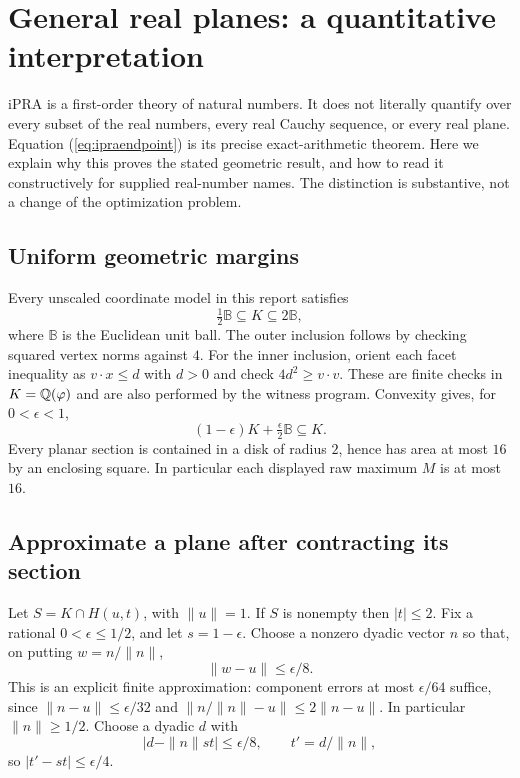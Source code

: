 \section{General real planes: a quantitative interpretation}
\label{sec:realinputs}
iPRA is a first-order theory of natural numbers. It does not literally
quantify over every subset of the real numbers, every real Cauchy
sequence, or every real plane. Equation (\ref{eq:ipraendpoint}) is its
precise exact-arithmetic theorem. Here we explain why this proves the
stated geometric result, and how to read it constructively for supplied
real-number names. The distinction is substantive, not a change of the
optimization problem.

\subsection{Uniform geometric margins}
Every unscaled coordinate model in this report satisfies
\[
 \tfrac12\mathbb B\subseteq K\subseteq2\mathbb B,
                                                               \tag{R1}
\]
where $\mathbb B$ is the Euclidean unit ball. The outer inclusion follows
by checking squared vertex norms against $4$. For the inner inclusion,
orient each facet inequality as $v\cdot x\le d$ with $d>0$ and check
$4d^2\ge v\cdot v$. These are finite checks in $K=\mathbb Q(\varphi)$ and
are also performed by the witness program. Convexity gives, for
$0<\epsilon<1$,
\begin{equation}
 (1-\epsilon)K+\tfrac\epsilon2\mathbb B\subseteq K.
                                                               \label{eq:margin}
\end{equation}
Every planar section is contained in a disk of radius $2$, hence has
area at most $16$ by an enclosing square. In particular each displayed
raw maximum $M$ is at most $16$.

\subsection{Approximate a plane after contracting its section}
Let $S=K\cap H(u,t)$, with $\|u\|=1$. If $S$ is nonempty then
$|t|\le2$. Fix a rational $0<\epsilon\le1/2$, and let $s=1-\epsilon$.
Choose a nonzero dyadic vector $n$ so that, on putting $w=n/\|n\|$,
\[
 \|w-u\|\le\epsilon/8.
\]
This is an explicit finite approximation: component errors at most
$\epsilon/64$ suffice, since $\|n-u\|\le\epsilon/32$ and
$\|n/\|n\|-u\|\le2\|n-u\|$. In particular $\|n\|\ge1/2$.
Choose a dyadic $d$ with
\[
 |d-\|n\|st|\le\epsilon/8,
 \qquad t'=d/\|n\|,
\]
so $|t'-st|\le\epsilon/4$.

